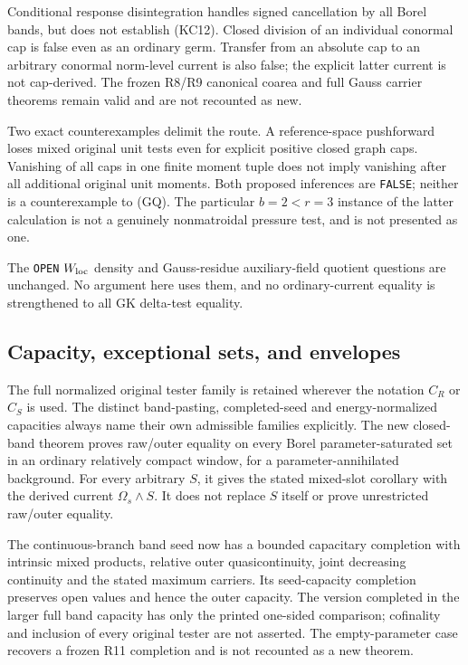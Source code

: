 \documentclass[11pt,a4paper]{article}
\numberwithin{equation}{section}
\theoremstyle{definition}
\theoremstyle{remark}
\begin{document}
Conditional response disintegration handles signed cancellation
by all Borel bands, but does not establish (KC12). Closed division
of an individual conormal cap is false even as an ordinary germ.
Transfer from an absolute cap to an arbitrary conormal norm-level
current is also false; the explicit latter current is not
cap-derived. The frozen R8/R9 canonical coarea and full Gauss
carrier theorems remain valid and are not recounted as new.

Two exact counterexamples delimit the route. A reference-space
pushforward loses mixed original unit tests even for explicit
positive closed graph caps. Vanishing of all caps in one finite
moment tuple does not imply vanishing after all additional original
unit moments. Both proposed inferences are \texttt{FALSE}; neither
is a counterexample to (GQ). The particular $b=2<r=3$ instance of
the latter calculation is not a genuinely nonmatroidal pressure
test, and is not presented as one.

The \texttt{OPEN} $W_{\rm loc}$ density and Gauss-residue
auxiliary-field quotient questions are unchanged. No argument
here uses them, and no ordinary-current equality is strengthened
to all GK delta-test equality.

\subsection{Capacity, exceptional sets, and envelopes}

The full normalized original tester family is retained wherever
the notation $C_R$ or $C_S$ is used. The distinct band-pasting,
completed-seed and energy-normalized capacities always name their
own admissible families explicitly. The new closed-band theorem proves raw/outer
equality on every Borel parameter-saturated set in an ordinary
relatively compact window, for a parameter-annihilated background.
For every arbitrary $S$, it gives the stated mixed-slot corollary
with the derived current $\Omega_s\wedge S$. It does not replace
$S$ itself or prove unrestricted raw/outer equality.

The continuous-branch band seed now has a bounded capacitary
completion with intrinsic mixed products, relative outer
quasicontinuity, joint decreasing continuity and the stated
maximum carriers. Its seed-capacity completion preserves open
values and hence the outer capacity. The version completed in
the larger full band capacity has only the printed one-sided
comparison; cofinality and inclusion of every original tester
are not asserted. The empty-parameter case recovers a frozen
R11 completion and is not recounted as a new theorem.
\end{document}
